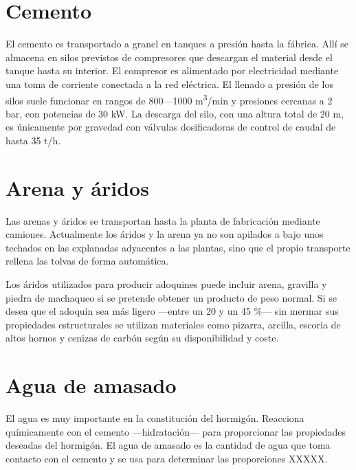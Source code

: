 \section{Cemento}
El cemento es transportado a granel en tanques a presión hasta la fábrica. Allí se almacena en silos previstos de compresores que descargan el material desde el tanque hasta su interior. El compresor es alimentado por electricidad mediante una toma de corriente conectada a la red eléctrica. El llenado a presión de los silos suele funcionar en rangos de 800—1000 \si{\cubic\meter/\minute} y presiones cercanas a 2 \si{\bar}, con potencias de 30 \si{\kilo\watt}. La descarga del silo, con una altura total de 20 \si{\meter}, es únicamente por gravedad con válvulas dosificadoras de control de caudal de hasta 35 \si{\tonne/\hour}.

\section{Arena y áridos}
Las arenas y áridos se transportan hasta la planta de fabricación mediante camiones. Actualmente los áridos y la arena ya no son apilados a bajo unos techados en las explanadas adyacentes a las plantas, sino que el propio transporte rellena las tolvas de forma automática.

Los áridos utilizados para producir adoquines puede incluir arena, gravilla y piedra de machaqueo si se pretende obtener un producto de peso normal. Si se desea que el adoquín sea más ligero —entre un 20 y un 45 \%— sin mermar sus propiedades estructurales se utilizan materiales como pizarra, arcilla, escoria de altos hornos y cenizas de carbón según su disponibilidad y coste.

\section{Agua de amasado}
El agua es muy importante en la constitución del hormigón. Reacciona químicamente con el cemento —hidratación— para proporcionar las propiedades deseadas del hormigón. El agua de amasado es la cantidad de agua que toma contacto con el cemento y se usa para determinar las proporciones XXXXX.

